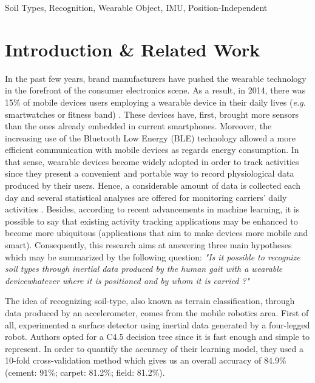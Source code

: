 \documentclass[conference]{IEEEtran}
\begin{document}
\begin{IEEEkeywords}
Soil Types, Recognition, Wearable Object, IMU, Position-Independent
\end{IEEEkeywords}

%
\IEEEpeerreviewmaketitle



\section{Introduction \& Related Work}
In the past few years, brand manufacturers have pushed the wearable 
technology in the forefront of the consumer electronics scene. As a result, in 2014, there was 15\% of mobile devices users employing a wearable device in their daily lives (\textit{e.g.} smartwatches or fitness band) \cite{Nielsen2014}. These devices have, first, brought more sensors than the ones already embedded in current smartphones. Moreover, the increasing use of the Bluetooth Low Energy (BLE) technology \cite{Taplett} allowed a more efficient communication with mobile devices as regards energy consumption. In that sense, wearable devices become widely adopted in order to track activities since they present a convenient and portable way to record physiological data produced by their users. Hence, a considerable amount of data is collected each day and several statistical analyses are offered for monitoring carriers' daily activities \cite{Patel2015}. Besides, according to recent advancements in machine learning, it is possible to say that existing activity tracking applications may be enhanced to become more ubiquitous (applications that aim to make devices more mobile and smart). Consequently, this research aims at answering three main hypotheses which may be summarized by the following question: \textit{"Is it possible to recognize soil types through inertial data produced by the human gait with a wearable device\textemdash whatever where it is positioned and by whom it is carried ?"}

The idea of recognizing soil-type, also known as terrain classification, through data produced by an accelerometer, comes from the mobile robotics area. First of all, \citet{Vail2004} experimented a surface detector using inertial data generated by a four-legged robot. Authors opted for a C4.5 decision tree since it is fast enough and simple to represent. In order to quantify the accuracy of their learning model, they used a 10-fold cross-validation method which gives us an overall accuracy of 84.9\% (cement: 91\%; carpet: 81.2\%; field: 81.2\%). 
 
\end{document}
